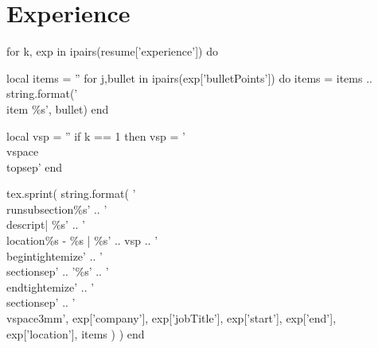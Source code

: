 \documentclass[]{plushcv}
\begin{document}
\begin{minipage}[t]{0.70\textwidth}



\section{Experience}

\begin{luacode}
  for k, exp in ipairs(resume['experience']) do

    local items = ''
    for j,bullet in ipairs(exp['bulletPoints']) do
      items = items .. string.format('\\item \%s', bullet)
    end

    local vsp = ''
    if k == 1 then
      vsp = '\\vspace{\\topsep}'
    end

    tex.sprint(
      string.format(
	'\\runsubsection{\%s}' ..
	'\\descript{| \%s}' ..
	'\\location{\%s - \%s | \%s}' ..
	vsp ..
	'\\begin{tightemize}' ..
	'\\sectionsep' ..
	'\%s' ..
	'\\end{tightemize}' ..
	'\\sectionsep' ..
	'\\vspace{3mm}',
	exp['company'],
	exp['jobTitle'],
	exp['start'],
	exp['end'],
	exp['location'],
	items
      )
    )
  end
\end{luacode}





\end{minipage}
\end{document}
